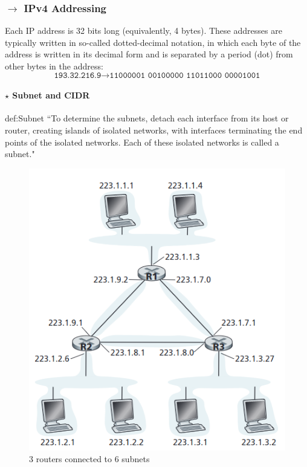 \subsubsection[4.4.2 IPv4 Addressing]{$\rightarrow$ IPv4 Addressing}

\noindent Each IP address is 32 bits long (equivalently, 4 bytes). These addresses are typically written in so-called dotted-decimal notation, in which each byte of the address is written in its decimal form and is separated by a period (dot) from other bytes in the address:
$$
    \texttt{193.32.216.9} \pmb{\rightarrow} \texttt{11000001 00100000 11011000 00001001}
$$

\paragraph[4.4.2.1 Subnet and CIDR]{$\pmb{\star}$ Subnet and CIDR}\mbox{}
\begin{theo}{def:Subnet}\label{def:Subnet}
    ``To determine the subnets, detach each interface from its host or router, creating islands of isolated networks, with interfaces terminating the end points of the isolated networks. Each of these isolated networks is called a subnet."\cite{Kurose2017}
\end{theo}

\vspace{-0.5em}
\begin{figure}[H]
    \centering
    \includegraphics[width = 0.5\linewidth]{img/4/data-plane/Subnets}
    \caption{3 routers connected to 6 subnets}
    \label{fig:Subnet}
\end{figure}

